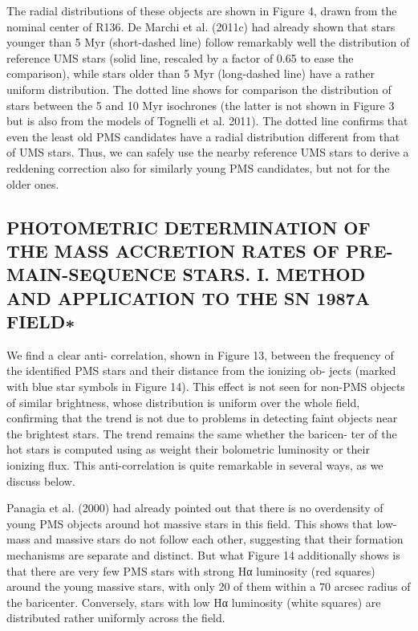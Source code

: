 \documentclass[../Main.tex]{subfiles}
\begin{document}
{The radial distributions of these objects are shown in Figure 4, drawn from the nominal center of R136. De Marchi et al. (2011c) had already shown that stars younger than 5 Myr (short-dashed line) follow remarkably well the distribution of reference UMS stars (solid line, rescaled by a factor of 0.65 to ease the comparison), while stars older than 5 Myr (long-dashed line) have a rather uniform distribution. The dotted line shows for comparison the distribution of stars between the 5 and 10 Myr isochrones (the latter is not shown in Figure 3 but is also from the models of Tognelli et al. 2011). The dotted line confirms that even the least old PMS candidates have a radial distribution different from that of UMS stars. Thus, we can safely use the nearby reference UMS stars to derive a reddening correction also for similarly young PMS candidates, but not for the older ones.

\subsection{PHOTOMETRIC DETERMINATION OF THE MASS ACCRETION RATES OF PRE-MAIN-SEQUENCE STARS. I.
METHOD AND APPLICATION TO THE SN 1987A FIELD∗}

We find a clear anti-
correlation, shown in Figure 13, between the frequency of the
identified PMS stars and their distance from the ionizing ob-
jects (marked with blue star symbols in Figure 14). This effect
is not seen for non-PMS objects of similar brightness, whose
distribution is uniform over the whole field, confirming that the
trend is not due to problems in detecting faint objects near the
brightest stars. The trend remains the same whether the baricen-
ter of the hot stars is computed using as weight their bolometric
luminosity or their ionizing flux. This anti-correlation is quite
remarkable in several ways, as we discuss below.

Panagia et al. (2000) had already pointed out that there is no
overdensity of young PMS objects around hot massive stars in
this field. This shows that low-mass and massive stars do not
follow each other, suggesting that their formation mechanisms
are separate and distinct. But what Figure 14 additionally shows
is that there are very few PMS stars with strong Hα luminosity
(red squares) around the young massive stars, with only 20%
of them within a 70 arcsec radius of the baricenter. Conversely,
stars with low Hα luminosity (white squares) are distributed
rather uniformly across the field.

}
\end{document}
